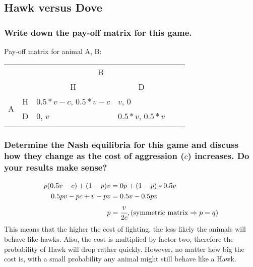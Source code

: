 \subsection{Hawk versus Dove}

    \subsubsection{Write down the pay-off matrix for this game.}
    Pay-off matrix for animal A, B:
        \begin{table}[h]
            \centering
            \begin{tabular}{llllll}
                &                                                 & \multicolumn{2}{c}{B}                                                                                               & & \\
                &                                                 & \multicolumn{1}{c}{H}                                     & \multicolumn{1}{c}{D}                                   & & \\ \cline{3-4}
                \multirow{2}{*}{A}       & \multicolumn{1}{r|}{H} & \multicolumn{1}{l|}{$0.5*v-c$, $0.5*v-c$} & \multicolumn{1}{l|}{$v$, 0}                             & & \\ \cline{3-4}
                                         & \multicolumn{1}{l|}{D} & \multicolumn{1}{l|}{0, $v$}                               & \multicolumn{1}{l|}{$0.5*v$, $0.5*v$} & & \\ \cline{3-4}
                &                        &                        &                                                           & &
            \end{tabular}
        \end{table}

    \subsubsection{Determine the Nash equilibria for this game and discuss how they change as the cost of aggression ($c$) increases. Do your results make sense?}
        \begin{align*}
            \begin{split}
                p(0.5v-c)+(1-p)v&=0p+(1-p)*0.5v\\
                0.5pv-pc+v-pv &=0.5v-0.5pv\\
                p&=\cfrac{v}{2c}, (\text{symmetric matrix}\Rightarrow p=q)
            \end{split}
        \end{align*}
        This means that the higher the cost of fighting, the less likely the animals will behave like
        hawks. Also, the cost is multiplied by factor two, therefore the probability of Hawk will drop rather
        quickly. However, no matter how big the cost is, with a small probability any animal might still behave like
        a Hawk.

